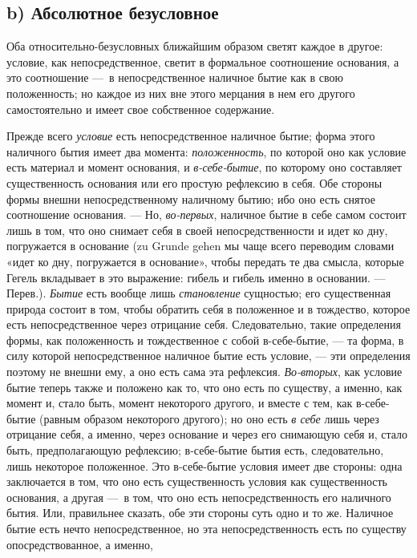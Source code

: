 \subsection[b) Абсолютное безусловное]{b) Абсолютное безусловное}

Оба относительно-безусловных ближайшим образом
светят каждое в другое: условие, как непосредственное, светит в формальное
соотношение основания, а это соотношение —~в непосредственное наличное
бытие как в свою положенность; но каждое из них вне этого мерцания в нем
его другого самостоятельно и имеет свое собственное содержание.

Прежде всего {\em условие} есть непосредственное
наличное бытие; форма этого наличного бытия имеет два момента:
{\em положенность}, по которой оно как условие есть
материал и момент основания, и {\em в-себе-бытие}, по
которому оно составляет существенность основания или его простую рефлексию
в себя. Обе стороны формы внешни непосредственному наличному бытию; ибо оно
есть снятое соотношение основания. — Но,
{\em во-первых}, наличное бытие в себе самом состоит
лишь в том, что оно снимает себя в своей непосредственности и идет ко дну,
погружается в основание (zu Grunde gehen мы чаще всего переводим словами
«идет ко дну, погружается в основание», чтобы передать те два смысла,
которые Гегель вкладывает в это выражение: гибель и гибель именно в
основании. — Перев.). {\em Бытие} есть вообще лишь
{\em становление} сущностью; его существенная природа
состоит в том, чтобы обратить себя в положенное и в тождество, которое есть
непосредственное через отрицание себя. Следовательно, такие определения
формы, как положенность и тождественное с собой в-себе-бытие, — та форма, в
силу которой непосредственное наличное бытие есть условие, — эти
определения поэтому не внешни ему, а оно есть сама эта рефлексия.
{\em Во-вторых}, как условие бытие теперь также и
положено как то, что оно есть по существу, а именно, как момент и, стало
быть, момент некоторого другого, и вместе с тем, как в-себе-бытие (равным
образом некоторого другого); но оно есть {\em в себе}
лишь через отрицание себя, а именно, через основание и через его снимающую
себя и, стало быть, предполагающую рефлексию; в-себе-бытие бытия есть,
следовательно, лишь некоторое положенное. Это в-себе-бытие условия имеет
две стороны: одна заключается в том, что оно есть существенность условия
как существенность основания, а другая —~в том, что оно есть
непосредственность его наличного бытия. Или, правильнее сказать, обе эти
стороны суть одно и то же. Наличное бытие есть нечто непосредственное, но
эта непосредственность есть по существу опосредствованное, а именно,
